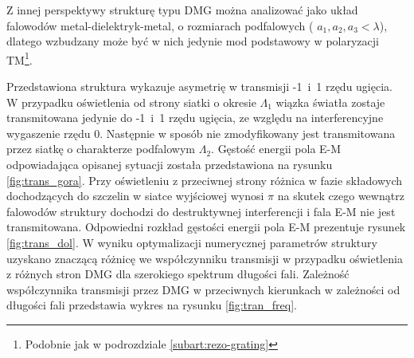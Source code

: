  Z innej perspektywy strukturę typu DMG można analizować jako układ falowodów metal-dielektryk-metal, o rozmiarach podfalowych ( $a_1,a_2,a_3 < \lambda$), dlatego wzbudzany może być w nich jedynie mod podstawowy w polaryzacji TM\footnote{Podobnie jak w  podrozdziale \ref{subart:rezo-grating}}. 

Przedstawiona struktura wykazuje asymetrię w transmisji -1~i~1 rzędu ugięcia. W przypadku oświetlenia od strony siatki o okresie $\Lambda_1$ wiązka światła zostaje transmitowana jedynie do -1~i~1 rzędu ugięcia, ze względu na interferencyjne wygaszenie rzędu 0. Następnie w sposób nie zmodyfikowany jest transmitowana przez siatkę o charakterze podfalowym $\Lambda_2$. Gęstość energii pola E-M odpowiadająca opisanej sytuacji została przedstawiona na rysunku \ref{fig:trans_gora}. 
	Przy oświetleniu z przeciwnej strony różnica w fazie składowych dochodzących do szczelin w siatce wyjściowej wynosi $\pi$ na skutek czego wewnątrz falowodów struktury dochodzi do destruktywnej interferencji i fala E-M nie jest transmitowana. Odpowiedni rozkład gęstości energii pola E-M prezentuje rysunek \ref{fig:trans_dol}. W wyniku optymalizacji numerycznej parametrów struktury uzyskano znaczącą różnicę we współczynniku transmisji w przypadku oświetlenia z różnych stron DMG dla szerokiego spektrum długości fali. Zależność współczynnika transmisji przez DMG w przeciwnych kierunkach w zależności od długości fali przedstawia wykres na rysunku \ref{fig:tran_freq}.


